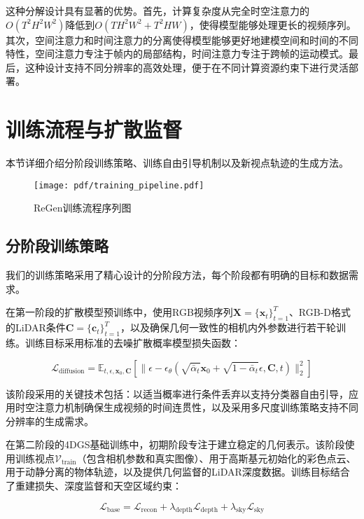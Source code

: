 这种分解设计具有显著的优势。首先，计算复杂度从完全时空注意力的$O(T^2H^2W^2)$降低到$O(TH^2W^2 + T^2HW)$，使得模型能够处理更长的视频序列。其次，空间注意力和时间注意力的分离使得模型能够更好地建模空间和时间的不同特性，空间注意力专注于帧内的局部结构，时间注意力专注于跨帧的运动模式。最后，这种设计支持不同分辨率的高效处理，便于在不同计算资源约束下进行灵活部署。

\section{训练流程与扩散监督}

本节详细介绍分阶段训练策略、训练自由引导机制以及新视点轨迹的生成方法。

\begin{figure}[htbp]
  \centering
  \texttt{[image: pdf/training\_pipeline.pdf]}
  \caption{ReGen训练流程序列图}
  \label{fig:training-pipeline}
\end{figure}

\subsection{分阶段训练策略}

我们的训练策略采用了精心设计的分阶段方法，每个阶段都有明确的目标和数据需求。

在第一阶段的扩散模型预训练中，使用RGB视频序列$\mathbf{X} = \{\mathbf{x}_t\}_{t=1}^{T}$、RGB-D格式的LiDAR条件$\mathbf{C} = \{\mathbf{c}_t\}_{t=1}^{T}$，以及确保几何一致性的相机内外参数进行若干轮训练。训练目标采用标准的去噪扩散概率模型损失函数：

\begin{equation}
\mathcal{L}_{\text{diffusion}} = \mathbb{E}_{t,\epsilon,\mathbf{x}_0,\mathbf{C}} \left[ \|\epsilon - \epsilon_\theta(\sqrt{\bar{\alpha}_t} \mathbf{x}_0 + \sqrt{1-\bar{\alpha}_t} \epsilon, \mathbf{C}, t)\|_2^2 \right]
\label{eq:diffusion_pretraining}
\end{equation}

该阶段采用的关键技术包括：以适当概率进行条件丢弃以支持分类器自由引导，应用时空注意力机制确保生成视频的时间连贯性，以及采用多尺度训练策略支持不同分辨率的生成需求。

在第二阶段的4DGS基础训练中，初期阶段专注于建立稳定的几何表示。该阶段使用训练视点$\mathcal{V}_{\text{train}}$（包含相机参数和真实图像）、用于高斯基元初始化的彩色点云、用于动静分离的物体轨迹，以及提供几何监督的LiDAR深度数据。训练目标结合了重建损失、深度监督和天空区域约束：

\begin{equation}
\mathcal{L}_{\text{base}} = \mathcal{L}_{\text{recon}} + \lambda_{\text{depth}} \mathcal{L}_{\text{depth}} + \lambda_{\text{sky}} \mathcal{L}_{\text{sky}}
\label{eq:base_training}
\end{equation}


